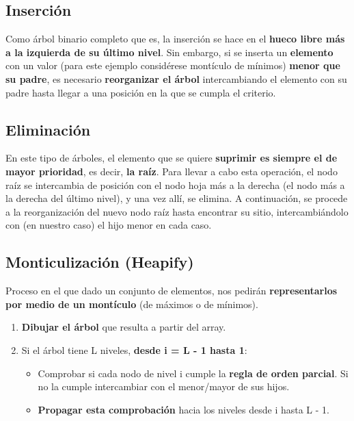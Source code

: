 \documentclass{article}
\begin{document}
\subsection{Inserción}
Como árbol binario completo que es, la inserción se hace en el \textbf{hueco libre más a la izquierda de su último nivel}. Sin embargo, si se inserta un \textbf{elemento} con un valor (para este ejemplo considérese montículo de mínimos) \textbf{menor que su padre}, es necesario \textbf{reorganizar el árbol} intercambiando el elemento con su padre hasta llegar a una posición en la que se cumpla el criterio.

\subsection{Eliminación}
En este tipo de árboles, el elemento que se quiere \textbf{suprimir es siempre el de mayor prioridad}, es decir, \textbf{la raíz}. Para llevar a cabo esta operación, el nodo raíz se intercambia de posición con el nodo hoja más a la derecha (el nodo más a la derecha del último nivel), y una vez allí, se elimina. A continuación, se procede a la reorganización del nuevo nodo raíz hasta encontrar su sitio, intercambiándolo con (en nuestro caso) el hijo menor en cada caso.

\subsection{Monticulización (Heapify)}
Proceso en el que dado un conjunto de elementos, nos pedirán \textbf{representarlos por medio de un montículo} (de máximos o de mínimos).

\begin{enumerate}
    \item \textbf{Dibujar el árbol} que resulta a partir del array.
    \item Si el árbol tiene L niveles, \textbf{desde i = L - 1 hasta 1}:
    \begin{itemize}
        \item Comprobar si cada nodo de nivel i cumple la \textbf{regla de orden parcial}. Si no la cumple intercambiar con el menor/mayor de sus hijos.
        \item \textbf{Propagar esta comprobación} hacia los niveles desde i hasta L - 1.
    \end{itemize}
\end{enumerate}

\end{document}
